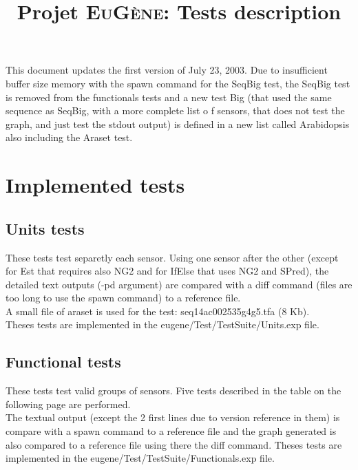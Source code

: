 \documentclass[a4paper,11pt]{article}
\newcommand{\EuGenie}{\textsc{EuG{\`e}ne}}
\begin{document}
\setlength{\parindent}{0pt}

\title{Projet \EuGenie: Tests description}
\maketitle

This document updates the first version of July 23, 2003.
Due to insufficient buffer size memory with the spawn command for the SeqBig test, the SeqBig test is removed from the functionals tests and a new test Big (that used the same sequence as SeqBig, with a more complete list o
f sensors, that does not test the graph, and just test the stdout output) is defined in a new list called Arabidopsis also including the Araset test.

\section{Implemented tests}

\subsection{Units tests}
These tests test separetly each sensor. Using one sensor after the other (except for Est that requires also NG2 and for IfElse that uses NG2 and SPred), the detailed text outputs (-pd argument) are compared with a diff command (files are too long to use the spawn command) to a reference file.\\
A small file of araset is used for the test: seq14ac002535g4g5.tfa (8 Kb).\\
Theses tests are implemented in the eugene/Test/TestSuite/Units.exp file.\\

\subsection{Functional tests}
These tests test valid groups of sensors. Five tests described in the table on the following page are performed. \\
The textual output (except the 2 first lines due to version reference in them) is compare with a spawn command to a reference file and the graph generated is also compared to a reference file using there the diff command.  
Theses tests are implemented in the eugene/Test/TestSuite/Functionals.exp file.
\end{document}
